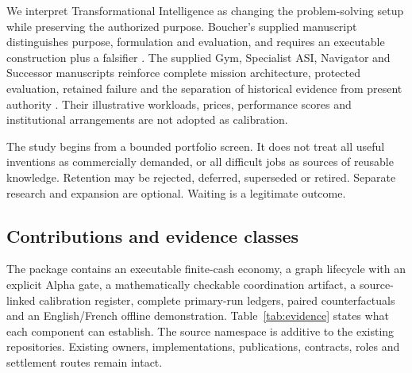\documentclass[11pt,letterpaper]{article}
\begin{document}
We interpret Transformational Intelligence as changing the problem-solving
setup while preserving the authorized purpose. Boucher's supplied manuscript
distinguishes purpose, formulation and evaluation, and requires an executable
construction plus a falsifier \citep{transformational}. The supplied Gym,
Specialist ASI, Navigator and Successor manuscripts reinforce complete mission
architecture, protected evaluation, retained failure and the separation of
historical evidence from present authority \citep{gym,navigator,successor}.
Their illustrative workloads, prices, performance scores and institutional
arrangements are not adopted as calibration.

The study begins from a bounded portfolio screen. It does not treat all useful
inventions as commercially demanded, or all difficult jobs as sources of reusable
knowledge. Retention may be rejected, deferred, superseded or retired. Separate
research and expansion are optional. Waiting is a legitimate outcome.

\subsection{Contributions and evidence classes}

The package contains an executable finite-cash economy, a graph lifecycle with
an explicit Alpha gate, a mathematically checkable coordination artifact, a
source-linked calibration register, complete primary-run ledgers, paired
counterfactuals and an English/French offline demonstration. Table~\ref{tab:evidence}
states what each component can establish. The source namespace is additive to
the existing repositories. Existing owners, implementations, publications,
contracts, roles and settlement routes remain intact.
\end{document}
